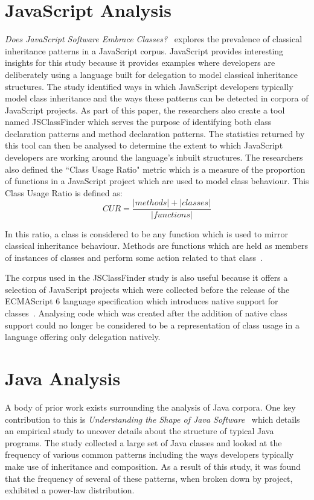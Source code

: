 \section{JavaScript Analysis}
\label{sec:litJavaScript}
\textit{Does JavaScript Software Embrace Classes?}~\cite{JSClassFinder} explores the prevalence of classical inheritance patterns in a JavaScript corpus. JavaScript provides interesting insights for this study because it provides examples where developers are deliberately using a language built for delegation to model classical inheritance structures. The study identified ways in which JavaScript developers typically model class inheritance and the ways these patterns can be detected in corpora of JavaScript projects. As part of this paper, the researchers also create a tool named JSClassFinder which serves the purpose of identifying both class declaration patterns and method declaration patterns. The statistics returned by this tool can then be analysed to determine the extent to which JavaScript developers are working around the language's inbuilt structures. The researchers also defined the ``Class Usage Ratio" metric which is a measure of the proportion of functions in a JavaScript project which are used to model class behaviour. This Class Usage Ratio is defined as:
\[CUR = \frac{\left\vert methods \right\vert + \left\vert classes \right\vert}{\left\vert functions \right\vert}\]

In this ratio, a class is considered to be any function which is used to mirror classical inheritance behaviour. Methods are functions which are held as members of instances of classes and perform some action related to that class~\cite{JSClassFinder}.
\newline

The corpus used in the JSClassFinder study is also useful because it offers a selection of JavaScript projects which were collected before the release of the ECMAScript 6 language specification which introduces native support for classes~\cite{ES6Spec, JSClassFinder}. Analysing code which was created after the addition of native class support could no longer be considered to be a representation of class usage in a language offering only delegation natively.

\section{Java Analysis}
A body of prior work exists surrounding the analysis of Java corpora. One key contribution to this is \textit{Understanding the Shape of Java Software}~\cite{ShapeOfJava} which details an empirical study to uncover details about the structure of typical Java programs. The study collected a large set of Java classes and looked at the frequency of various common patterns including the ways developers typically make use of inheritance and composition. As a result of this study, it was found that the frequency of several of these patterns, when broken down by project, exhibited a power-law distribution.
\newline

